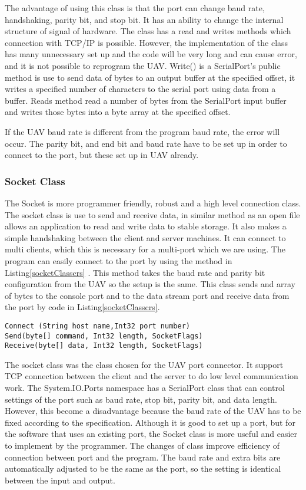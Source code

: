 The advantage of using this class is that the port can change baud rate, handshaking, parity bit, and stop bit. It has an ability to change the internal structure of signal of hardware. The class has a read and writes methods which connection with TCP/IP is possible.
However, the implementation of the class has many unnecessary set up and the code will be very long and can cause error, and it is not possible to reprogram the UAV.
Write() is a SerialPort's public method is use to send data of bytes to an output buffer at the specified offset, it writes a specified number of characters to the serial port using data from a buffer.
Reads method read a number of bytes from the SerialPort input buffer and writes those bytes into a byte array at the specified offset.

If the UAV baud rate is different from the program baud rate, the error will occur.
The parity bit, and end bit and baud rate have to be set up in order to connect to the port, but these set up in UAV already.

\subsubsection{Socket Class}
The Socket is more programmer friendly, robust and a high level connection class. The socket class is use to send and receive data, in similar method as an open file allows an application to read and write data to stable storage.  It also makes a simple handshaking between the client and server machines. It can connect to multi clients, which this is necessary for a multi-port which we are using. The program can easily connect to the port by using the method in Listing\ref{socketClasscrs} .
This method takes the baud rate and parity bit configuration from the UAV so the setup is the same. This class sends and array of bytes to the console port and to the data stream port and receive data from the port by code in Listing\ref{socketClasscrs}.

\begin{lstlisting}[caption=Socket class connect receive and send method,label=socketClasscrs]
Connect (String host name,Int32 port number)
Send(byte[] command, Int32 length, SocketFlags)
Receive(byte[] data, Int32 length, SocketFlags)
\end{lstlisting}

The socket class was the class chosen for the UAV port connector. 
It support TCP connection between the client and the server to do low level communication work\cite{xiaX}. 
The System.IO.Ports namespace has a SerialPort class that can control settings of the port such as baud rate, stop bit, parity bit, and data length.
However, this become a disadvantage because the baud rate of the UAV has to be fixed according to the specification. 
Although it is good to set up a port, but for the software that uses an existing port, the Socket class is more useful and easier to implement by the programmer. 
The changes of class improve efficiency of connection between port and the program. 
The baud rate and extra bits are automatically adjusted to be the same as the port, so the setting is identical between the input and output.